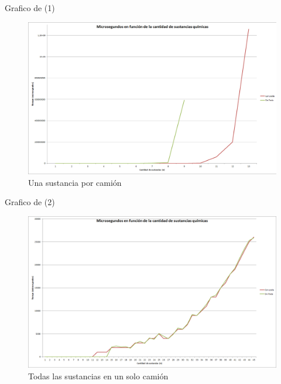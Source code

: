 Grafico de (1)

\begin{figure}[h]
  \centering
    \includegraphics[scale=0.45]{Imagenes/Ej3/1solocamion.png}
  \caption{Una sustancia por camión}
  \label{fig:ejemplo}
\end{figure}

Grafico de (2)

\begin{figure}[h]
  \centering
    \includegraphics[scale=0.45]{Imagenes/Ej3/todo1camion.png}
  \caption{Todas las sustancias en un solo camión}
  \label{fig:ejemplo}
\end{figure}